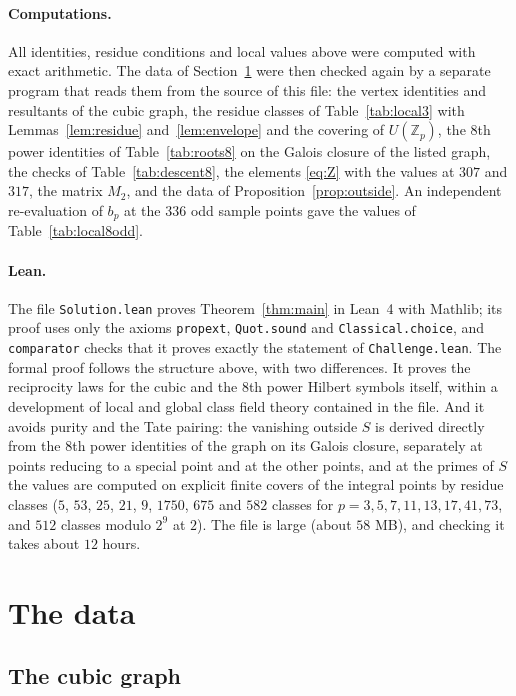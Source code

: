 \documentclass[11pt]{article}
\newcommand{\Z}{\mathbb{Z}}
\begin{document}
\paragraph{Computations.} All identities, residue conditions and local values above were computed with exact arithmetic. The data of Section~\ref{sec:data} were then checked again by a separate program that reads them from the source of this file: the vertex identities and resultants of the cubic graph, the residue classes of Table~\ref{tab:local3} with Lemmas~\ref{lem:residue} and~\ref{lem:envelope} and the covering of $U(\Z_p)$, the $8$th power identities of Table~\ref{tab:roots8} on the Galois closure of the listed graph, the checks of Table~\ref{tab:descent8}, the elements \eqref{eq:Z} with the values at $307$ and $317$, the matrix $M_2$, and the data of Proposition~\ref{prop:outside}. An independent re-evaluation of $b_p$ at the $336$ odd sample points gave the values of Table~\ref{tab:local8odd}.

\paragraph{Lean.} The file \texttt{Solution.lean} proves Theorem~\ref{thm:main} in Lean~4 with Mathlib; its proof uses only the axioms \texttt{propext}, \texttt{Quot.sound} and \texttt{Classical.choice}, and \texttt{comparator} checks that it proves exactly the statement of \texttt{Challenge.lean}. The formal proof follows the structure above, with two differences. It proves the reciprocity laws for the cubic and the $8$th power Hilbert symbols itself, within a development of local and global class field theory contained in the file. And it avoids purity and the Tate pairing: the vanishing outside $S$ is derived directly from the $8$th power identities of the graph on its Galois closure, separately at points reducing to a special point and at the other points, and at the primes of $S$ the values are computed on explicit finite covers of the integral points by residue classes ($5$, $53$, $25$, $21$, $9$, $1750$, $675$ and $582$ classes for $p=3,5,7,11,13,17,41,73$, and $512$ classes modulo $2^9$ at $2$). The file is large (about $58$ MB), and checking it takes about $12$ hours.

\section{The data}\label{sec:data}

\subsection{The cubic graph}\label{sec:data-cubic}
\end{document}
